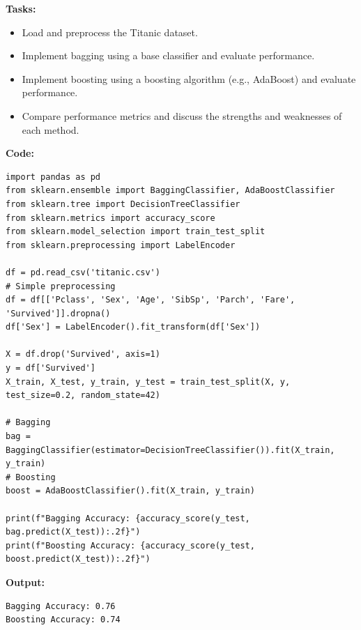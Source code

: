 \documentclass[12pt, a4paper]{article}
\begin{document}
\vspace{\baselineskip}
\noindent \textbf{Tasks:}\\
\vspace{-0.5\baselineskip}
\begin{itemize}[nosep]
    \item Load and preprocess the Titanic dataset.
    \item Implement bagging using a base classifier and evaluate performance.
    \item Implement boosting using a boosting algorithm (e.g., AdaBoost) and evaluate performance.
    \item Compare performance metrics and discuss the strengths and weaknesses of each method.
\end{itemize}

\vspace{\baselineskip}
\noindent \textbf{Code:}\\
\begin{lstlisting}
import pandas as pd
from sklearn.ensemble import BaggingClassifier, AdaBoostClassifier
from sklearn.tree import DecisionTreeClassifier
from sklearn.metrics import accuracy_score
from sklearn.model_selection import train_test_split
from sklearn.preprocessing import LabelEncoder

df = pd.read_csv('titanic.csv')
# Simple preprocessing
df = df[['Pclass', 'Sex', 'Age', 'SibSp', 'Parch', 'Fare', 'Survived']].dropna()
df['Sex'] = LabelEncoder().fit_transform(df['Sex'])

X = df.drop('Survived', axis=1)
y = df['Survived']
X_train, X_test, y_train, y_test = train_test_split(X, y, test_size=0.2, random_state=42)

# Bagging
bag = BaggingClassifier(estimator=DecisionTreeClassifier()).fit(X_train, y_train)
# Boosting
boost = AdaBoostClassifier().fit(X_train, y_train)

print(f"Bagging Accuracy: {accuracy_score(y_test, bag.predict(X_test)):.2f}")
print(f"Boosting Accuracy: {accuracy_score(y_test, boost.predict(X_test)):.2f}")
\end{lstlisting}

\vspace{\baselineskip}

\noindent \textbf{Output:}\\
\begin{lstlisting}[style=terminal]
Bagging Accuracy: 0.76
Boosting Accuracy: 0.74
\end{lstlisting}
\end{document}
